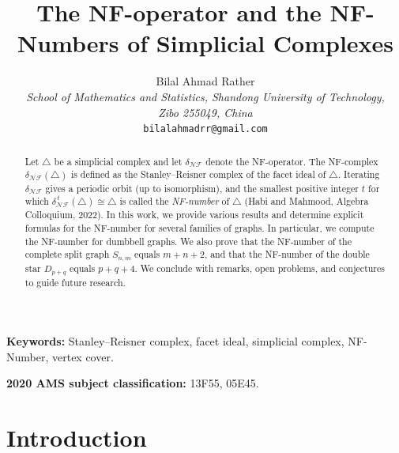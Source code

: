 \documentclass[12pt]{article}
\title{The NF-operator and the NF-Numbers of Simplicial Complexes}
\author{Bilal Ahmad Rather\\%
	{\em\small School of Mathematics and Statistics, Shandong University of Technology,}\\
	{\em \small Zibo 255049, China}\\
	\texttt{bilalahmadrr@gmail.com}
}
\date{}
\theoremstyle{plain}
\theoremstyle{definition}
\providecommand{\keywords}[1]
{
	\noindent\textbf{Keywords:} #1
}
\providecommand{\ams}[2]
{
	\noindent\textbf{2020 AMS subject classification:} #2
}
\begin{document}
	\maketitle
	
	\begin{abstract}
		Let $\bigtriangleup$ be a simplicial complex and let $\delta_{\mathcal{NF}}$ denote the NF-operator. The NF-complex $\delta_{\mathcal{NF}}(\bigtriangleup)$ is defined as the Stanley--Reisner complex of the facet ideal of $\bigtriangleup$. Iterating $\delta_{\mathcal{NF}}$ gives a periodic orbit (up to isomorphism), and the smallest positive integer $t$ for which $\delta_{\mathcal{NF}}^{\,t}(\bigtriangleup)\cong \bigtriangleup$ is called the \emph{NF-number} of $\bigtriangleup$ (Habi and Mahmood, Algebra Colloquium, 2022). In this work, we provide various results and determine explicit formulas for the NF-number for several families of graphs. In particular, we compute the NF-number for dumbbell graphs. We also prove that the NF-number of the complete split graph $S_{n,m}$ equals $m+n+2$, and that the NF-number of the double star $D_{p+q}$ equals $p+q+4$. We conclude with remarks, open problems, and conjectures to guide future research.
	\end{abstract}
	
	
	\keywords{Stanley–Reisner complex, facet ideal, simplicial complex, NF-Number, vertex cover.}
	
	\ams{}{13F55, 05E45.}
	
	
	\section{Introduction}
	
\end{document}
